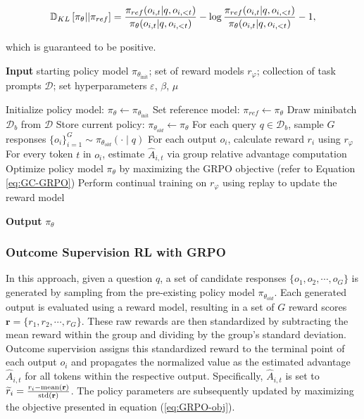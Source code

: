 \begin{itemize}[topsep=0pt]
\begin{itemize}[topsep=0pt]
\begin{equation}
\small
    \mathbb{D}_{KL}\left[\pi_{\theta} || \pi_{ref}\right] = \frac{\pi_{ref}(o_{i,t}|q,o_{i,<t})}{\pi_{\theta}(o_{i,t}|q,o_{i,<t})}- \log\frac{\pi_{ref}(o_{i,t}|q,o_{i,<t})}{\pi_{\theta}(o_{i,t}|q,o_{i,<t})} - 1,
\end{equation}

which is guaranteed to be positive.

\begin{algorithm}[t]
  \small
  \caption{Iterative Group Relative Policy Optimization}
  \textbf{Input} starting policy model $\pi_{\theta_{\text{init}}}$; set of reward models $r_\varphi$; collection of task prompts $\mathcal{D}$;
  set hyperparameters $\varepsilon$, $\beta$, $\mu$
  \begin{algorithmic}[1]
    \State Initialize policy model: $\pi_\theta \leftarrow \pi_{\theta_{\text{init}}}$
      \State Set reference model: $\pi_{ref} \leftarrow \pi_{\theta}$
        \State Draw minibatch $\mathcal{D}_b$ from $\mathcal{D}$
        \State Store current policy: $\pi_{\theta_{old}} \leftarrow \pi_{\theta}$
        \State For each query $q \in \mathcal{D}_b$, sample $G$ responses $\{o_i\}_{i=1}^G \sim \pi_{\theta_{old}} (\cdot \mid q)$
        \State For each output $o_i$, calculate reward $r_i$ using $r_\varphi$
        \State For every token $t$ in $o_i$, estimate $\hat{A}_{i,t}$ via group relative advantage computation
          \State Optimize policy model $\pi_\theta$ by maximizing the GRPO objective (refer to Equation \ref{eq:GC-GRPO})
        \EndFor
      \EndFor
      \State Perform continual training on $r_\varphi$ using replay to update the reward model
    \EndFor 
  \end{algorithmic}
  \textbf{Output} $\pi_\theta$
  \label{alg:iter-grpo}
\end{algorithm}

\subsubsection{Outcome Supervision RL with GRPO} In this approach, given a question $q$, a set of candidate responses $\{o_1, o_2, \cdots, o_G\}$ is generated by sampling from the pre-existing policy model $\pi_{\theta_{old}}$. Each generated output is evaluated using a reward model, resulting in a set of $G$ reward scores $\mathbf{r}=\{r_1, r_2, \cdots, r_G\}$. These raw rewards are then standardized by subtracting the mean reward within the group and dividing by the group's standard deviation. Outcome supervision assigns this standardized reward to the terminal point of each output $o_i$ and propagates the normalized value as the estimated advantage $\hat{A}_{i, t}$ for all tokens within the respective output. Specifically, $\hat{A}_{i, t}$ is set to $\widetilde{r}_i = \frac{r_i- {\rm mean}(\mathbf{r})}{{\rm std}(\mathbf{r})}$. The policy parameters are subsequently updated by maximizing the objective presented in equation (\ref{eq:GRPO-obj}).


\end{itemize}
\end{itemize}
